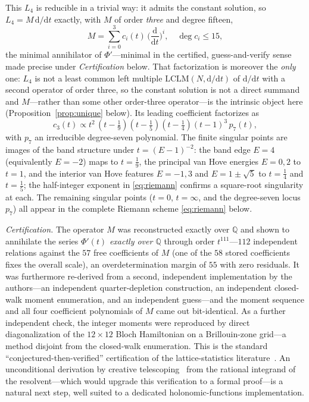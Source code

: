 \documentclass[11pt]{article}
\newcommand{\rmd}{\mathrm{d}}
\theoremstyle{plain}
\theoremstyle{remark}
\begin{document}
This $L_4$ is reducible in a trivial way: it admits the constant solution, so $L_4=M\,\rmd/\rmd t$ exactly, with
$M$ of order \emph{three} and degree fifteen,
\begin{equation}
M=\sum_{i=0}^{3}c_i(t)\,\Big(\frac{\rmd}{\rmd t}\Big)^{i},\quad \deg c_i\le 15,
\label{eq:M}
\end{equation}
the minimal annihilator of $\Phi'$---minimal in the certified, guess-and-verify sense
made precise under \emph{Certification} below. That factorization is moreover the \emph{only} one:
$L_4$ is not a least common left multiple $\mathrm{LCLM}(N,\rmd/\rmd t)$ of $\rmd/\rmd t$ with a
second operator of order three, so the constant solution is not a direct summand and $M$---rather
than some other order-three operator---is the intrinsic object here
(Proposition~\ref{prop:unique} below). Its leading coefficient factorizes as
\begin{equation}
c_3(t)\propto t^2\,(t-\tfrac19)(t-\tfrac15)(t-\tfrac14)(t-1)^3\,p_7(t),
\label{eq:lc}
\end{equation}
with $p_7$ an irreducible degree-seven polynomial. The finite singular points are images of the band structure
under $t=(E-1)^{-2}$: the band edge $E=4$ (equivalently $E=-2$) maps to $t=\tfrac19$, the principal van Hove
energies $E=0,2$ to $t=1$, and the interior van Hove features $E=-1,3$ and $E=1\pm\sqrt5$ to $t=\tfrac14$ and
$t=\tfrac15$; the half-integer exponent in \eqref{eq:riemann} confirms a square-root singularity at each. The
remaining singular points ($t=0$, $t=\infty$, and the degree-seven locus $p_7$) all appear in the complete Riemann
scheme \eqref{eq:riemann} below.

\emph{Certification.} The operator $M$ was reconstructed exactly over $\mathbb{Q}$ and shown to annihilate the
series $\Phi'(t)$ \emph{exactly over $\mathbb{Q}$} through order $t^{111}$---$112$ independent relations against
the $57$ free coefficients of $M$ (one of the $58$ stored coefficients fixes the overall scale), an
overdetermination margin of $55$ with zero residuals. It was
furthermore re-derived from a second, independent implementation by the authors---an independent
quarter-depletion construction, an independent closed-walk moment enumeration, and an independent
guess---and the moment sequence and all four coefficient polynomials of $M$ came out bit-identical.
As a further independent check, the
integer moments were reproduced by direct diagonalization of the $12\times12$ Bloch Hamiltonian on a
Brillouin-zone grid---a method disjoint from the closed-walk enumeration. This is the standard
``conjectured-then-verified'' certification of the lattice-statistics literature~\cite{Guttmann2010}. An
unconditional derivation by creative telescoping~\cite{Koutschan2013,Bostan2013} from the rational integrand of
the resolvent---which would upgrade this verification to a formal proof---is a natural next step, well suited to
a dedicated holonomic-functions implementation.
\end{document}
